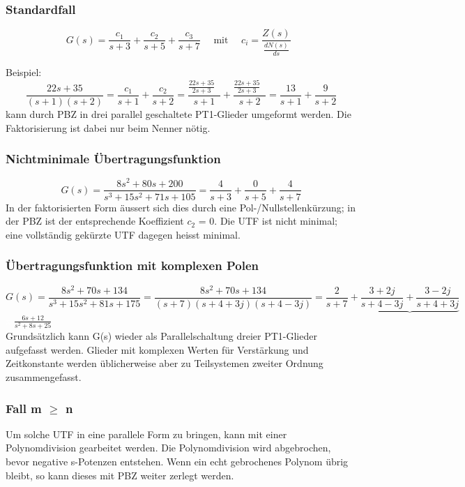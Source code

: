 \subsubsection{Standardfall}

\[ G(s) =\frac{c_{1}}{s+3} + \frac{c_{2}}{s+5} + \frac{c_{3}}{s+7} \quad \text{ mit } \quad {c_{i}= \frac{Z(s)}{\frac{dN(s)}{ds}}\mathop{\Bigg|_{s=p_{i}}}}\]

Beispiel: \[\frac{22s +35}{(s+1)(s+2)}=\frac{c_{1}}{s+1}+\frac{c_{2}}{s+2}=\frac{\frac{22s+35}{2s+3}\mathop{\Big|_{s=-1}}}{s+1}+\frac{\frac{22s+35}{2s+3}\mathop{\Big|_{s=-2}}}{s+2}=\frac{13}{s+1}+\frac{9}{s+2}\]
kann durch PBZ in drei parallel geschaltete PT1-Glieder umgeformt werden. Die
Faktorisierung ist dabei nur beim Nenner nötig.

\subsubsection{Nichtminimale Übertragungsfunktion}
\[G(s) =\frac{8s^{2} + 80s + 200}{s^3 + 15s^2 + 71s + 105}= \frac{4}{s+3} + \frac{0}{s+5} + \frac{4}{s+7}\]
In der faktorisierten Form äussert sich dies durch eine Pol-/Nullstellenkürzung; in der PBZ ist der entsprechende Koeffizient $c_{2}$ = 0. Die UTF ist nicht minimal; eine vollständig gekürzte UTF dagegen heisst minimal. \\

\subsubsection{Übertragungsfunktion mit komplexen Polen}
\[G(s) =\frac{8s^{2} + 70s + 134}{s^3 + 15s^2 + 81s + 175}= \frac{8s^2+70s+134}{(s+7)(s+4+3j)(s+4-3j)}=\frac{2}{s+7}+\underbrace{\frac{3+2j}{s+4-3j}+\frac{3-2j}{s+4+3j}}\]
\textcolor{white}{x} \hspace{14.5cm} $\frac{6s+12}{s^2+8s+25}$\\

Grundsätzlich kann G(s) wieder als Parallelschaltung dreier PT1-Glieder aufgefasst
werden. Glieder mit komplexen Werten für Verstärkung und Zeitkonstante werden
üblicherweise aber zu Teilsystemen zweiter Ordnung zusammengefasst.

\subsubsection{Fall m $\geq$ n}
Um solche UTF in eine
parallele Form zu bringen, kann mit einer Polynomdivision gearbeitet werden. Die Polynomdivision wird abgebrochen, bevor negative s-Potenzen entstehen. 
Wenn ein echt gebrochenes Polynom übrig bleibt, so kann dieses mit PBZ weiter zerlegt werden.


